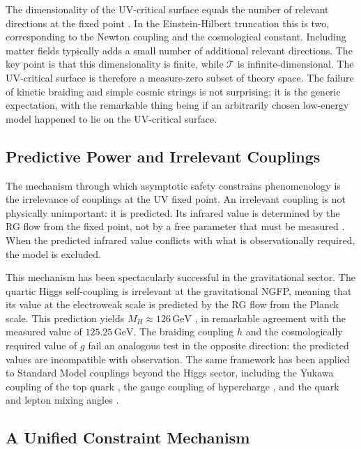 \documentclass[12pt,a4paper]{article}
\begin{document}
The dimensionality of the UV-critical surface equals the number of relevant
directions at the fixed point \cite{Eichhorn2019,Percacci2017}. In the
Einstein-Hilbert truncation this is two, corresponding to the Newton coupling
and the cosmological constant. Including matter fields typically adds a small
number of additional relevant directions. The key point is that this
dimensionality is finite, while $\mathcal{T}$ is infinite-dimensional. The
UV-critical surface is therefore a measure-zero subset of theory space. The
failure of kinetic braiding and simple cosmic strings is not surprising; it is
the generic expectation, with the remarkable thing being if an arbitrarily
chosen low-energy model happened to lie on the UV-critical surface.

\subsection{Predictive Power and Irrelevant Couplings}

The mechanism through which asymptotic safety constrains phenomenology is the
irrelevance of couplings at the UV fixed point. An irrelevant coupling is not
physically unimportant: it is predicted. Its infrared value is determined by
the RG flow from the fixed point, not by a free parameter that must be measured
\cite{WilsonKogut1974,Berges2002}. When the predicted infrared value conflicts
with what is observationally required, the model is excluded.

This mechanism has been spectacularly successful in the gravitational sector.
The quartic Higgs self-coupling is irrelevant at the gravitational NGFP,
meaning that its value at the electroweak scale is predicted by the RG flow
from the Planck scale. This prediction yields $M_H \approx 126\,\text{GeV}$
\cite{ReuterSaueressig2012,deBritoEichhornPfeiffer2023a}, in remarkable
agreement with the measured value of $125.25\,\text{GeV}$. The braiding
coupling $h$ and the cosmologically required value of $g$ fail an analogous
test in the opposite direction: the predicted values are incompatible with
observation. The same framework has been applied to Standard Model couplings
beyond the Higgs sector, including the Yukawa coupling of the top quark
\cite{deBritoEichhornRay2023}, the gauge coupling of hypercharge
\cite{deBritoEichhornLino2022}, and the quark and lepton mixing angles
\cite{EichhornGyftopoulos2025}.

\subsection{A Unified Constraint Mechanism}
\end{document}
